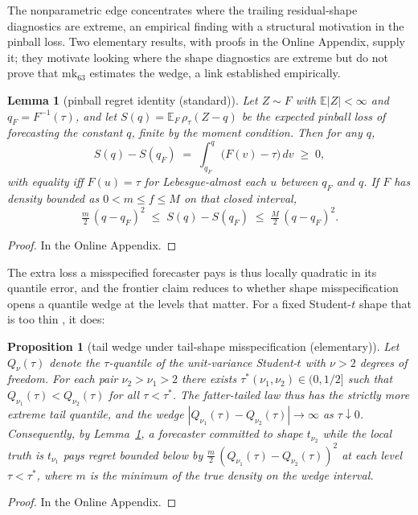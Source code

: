 \documentclass[11pt]{article}
\newtheorem{proposition}{Proposition}
\newtheorem{lemma}{Lemma}
\theoremstyle{remark}
\begin{document}
The nonparametric edge concentrates where the trailing residual-shape diagnostics are extreme, an empirical finding with a structural motivation in the pinball loss. Two elementary results, with proofs in the Online Appendix, supply it; they motivate looking where the shape diagnostics are extreme but do not prove that $\mathrm{mk}_{63}$ estimates the wedge, a link established empirically.

\begin{lemma}[pinball regret identity (standard)]\label{lem:regret}
Let $Z \sim F$ with $\mathbb{E}|Z| < \infty$ and $q_F = F^{-1}(\tau)$, and let $S(q) = \mathbb{E}_F\,\rho_\tau(Z - q)$ be the expected pinball loss of forecasting the constant $q$, finite by the moment condition. Then for any $q$,
\begin{equation}
S(q) - S(q_F) \;=\; \int_{q_F}^{q} \big(F(v) - \tau\big)\,dv \;\ge\; 0,
\label{eq:regret}
\end{equation}
with equality iff $F(u) = \tau$ for Lebesgue-almost each $u$ between $q_F$ and $q$.
If $F$ has density bounded as $0 < m \le f \le M$ on that closed interval,
\begin{equation}
\tfrac{m}{2}\,(q - q_F)^2 \;\le\; S(q) - S(q_F) \;\le\;
\tfrac{M}{2}\,(q - q_F)^2 .
\label{eq:quadratic}
\end{equation}
\end{lemma}
\begin{proof} In the Online Appendix. \end{proof}

The extra loss a misspecified forecaster pays is thus locally quadratic in its quantile error, and the frontier claim reduces to whether shape misspecification opens a quantile wedge at the levels that matter. For a fixed Student-$t$ shape that is too thin \citep{mcneilfrey2000, kuester2006}, it does:

\begin{proposition}[tail wedge under tail-shape misspecification (elementary)]
\label{prop:wedge}
Let $Q_\nu(\tau)$ denote the $\tau$-quantile of the unit-variance
Student-$t$ with $\nu > 2$ degrees of freedom. For each pair
$\nu_2 > \nu_1 > 2$ there exists $\tau^*(\nu_1,\nu_2) \in (0, 1/2]$
such that $Q_{\nu_1}(\tau) < Q_{\nu_2}(\tau)$ for all $\tau < \tau^*$. The fatter-tailed law thus has the strictly more extreme tail quantile, and the wedge $|Q_{\nu_1}(\tau) - Q_{\nu_2}(\tau)| \to \infty$ as $\tau \downarrow 0$. Consequently, by Lemma~\ref{lem:regret}, a
forecaster committed to shape $t_{\nu_2}$ while the local truth is
$t_{\nu_1}$ pays regret bounded below by
$\tfrac{m}{2}\,(Q_{\nu_1}(\tau) - Q_{\nu_2}(\tau))^2$ at each level
$\tau < \tau^*$, where $m$ is the minimum of the true density on the
wedge interval.
\end{proposition}
\begin{proof} In the Online Appendix. \end{proof}
\end{document}
